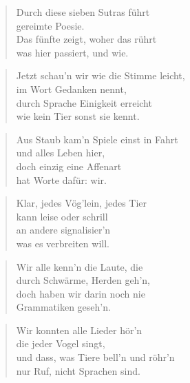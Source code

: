 \documentclass[10pt,a4paper]{article}
\begin{document}
\begin{multicols}{2}


\begin{verse}
Durch diese sieben Sutras führt \\
gereimte Poesie. \\
Das fünfte zeigt, woher das rührt \\
was hier passiert, und wie. \\
\end{verse}

\begin{verse}
Jetzt schau’n wir wie die Stimme leicht, \\
im Wort Gedanken nennt, \\
durch Sprache Einigkeit erreicht \\
wie kein Tier sonst sie kennt. \\
\end{verse}

\begin{verse}
Aus Staub kam’n Spiele einst in Fahrt \\
und alles Leben hier, \\
doch einzig eine Affenart \\
hat Worte dafür: wir. \\
\end{verse}

\begin{verse}
Klar, jedes Vög’lein, jedes Tier \\
kann leise oder schrill \\
an andere signalisier’n \\
was es verbreiten will. \\
\end{verse}

\begin{verse}
Wir alle kenn’n die Laute, die \\
durch Schwärme, Herden geh’n, \\
doch haben wir darin noch nie \\
Grammatiken geseh’n. \\
\end{verse}

\begin{verse}
Wir konnten alle Lieder hör’n \\
die jeder Vogel singt, \\
und dass, was Tiere bell’n und röhr’n \\
nur Ruf, nicht Sprachen sind. \\
\end{verse}


\end{multicols}
\end{document}
